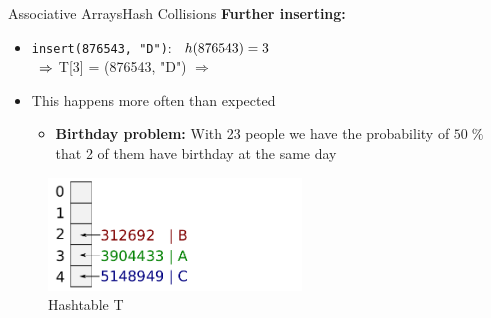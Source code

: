 \begin{frame}{Associative Arrays}{Hash Collisions}
  \textbf{Further inserting:}
  \begin{itemize}
    \item<1->
      \texttt{insert(876543, "D")}:
      $\hspace*{0.5em} h(876543) = 3$\\
      $\hspace*{0.5em} \Rightarrow$
      T[3] = (876543, "D")
      $\Rightarrow$ {\color{red}{Collision}}
    \item<3->
      This happens more often than expected
      \begin{itemize}
        \item
          \textbf{Birthday problem:}
          With 23 people we have the probability of $50\;\%$ that 2 of
          them have birthday at the same day
      \end{itemize}
  \end{itemize}
  \vspace*{-1.0em}
  \begin{figure}
    \caption{Hashtable T}
    \centering
       \includegraphics[width=0.6\textwidth]{Images/Bucket4.pdf}
  \end{figure}
\end{frame}


